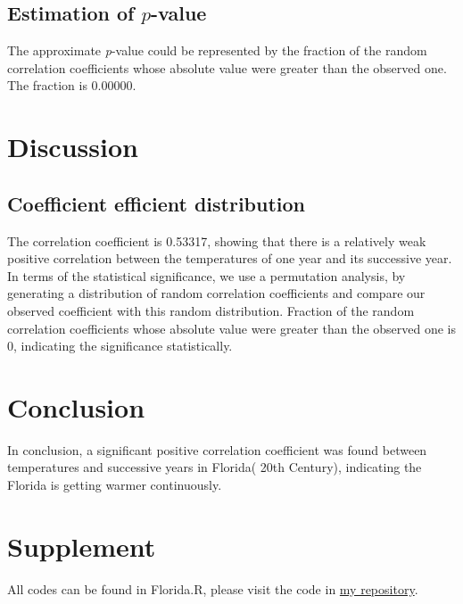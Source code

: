 \documentclass[12pt]{article}
\begin{document}
\subsection{Estimation of \texorpdfstring{$\mathit{p}$}{}-value}
The approximate \textit{p}-value could be represented by the fraction of the random correlation coefficients whose absolute value were greater than the observed one. The fraction is 0.00000.

\section{Discussion}

\subsection{Coefficient efficient distribution}
The correlation coefficient is 0.53317, showing that there is a relatively weak positive correlation between the temperatures of one year and its successive year. In terms of the statistical significance, we use a permutation analysis, by generating a distribution of random correlation coefficients and compare our observed coefficient with this random distribution. Fraction of the random correlation coefficients whose absolute value were greater than the observed one is 0, indicating the significance statistically.

\section{Conclusion}
In conclusion, a significant positive correlation coefficient was found between temperatures and successive years in Florida( 20th Century), indicating the Florida is getting warmer continuously.

\section{Supplement}
  All codes can be found in Florida.R, please visit the code in \href{https://github.com/nedchen2/CMEECourseWork/blob/master/week3/code/Florida.R}{my repository}.
\end{document}
